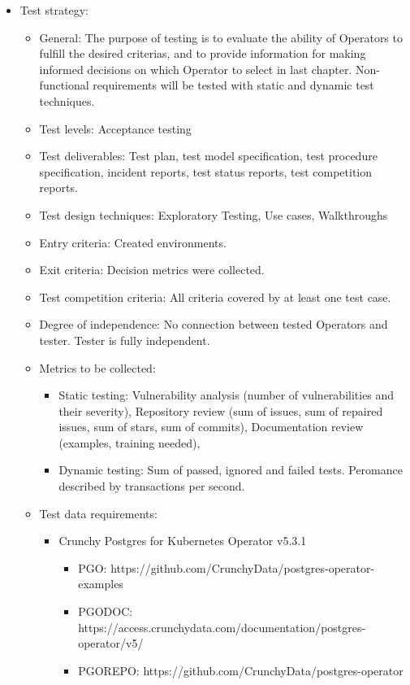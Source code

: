 \begin{itemize}
\begin{itemize}
          \end{itemize}
    \item Test strategy:
          \begin{itemize}
              \item General: The purpose of testing is to evaluate the ability of Operators to fulfill the desired criterias, and to provide information for making informed decisions on which Operator to select in last chapter. Non-functional requirements will be tested with static and dynamic test techniques.
              \item Test levels: Acceptance testing
              \item Test deliverables: Test plan, test model specification, test procedure specification, incident reports, test status reports, test competition reports.
              \item Test design techniques: Exploratory Testing, Use cases, Walkthroughs
              \item Entry criteria: Created environments.
              \item Exit criteria: Decision metrics were collected.
              \item Test competition criteria: All criteria covered by at least one test case.
              \item Degree of independence: No connection between tested Operators and tester. Tester is fully independent.
              \item Metrics to be collected:
                    \begin{itemize}
                        \item Static testing: Vulnerability analysis (number of vulnerabilities and their severity), Repository review (sum of issues, sum of repaired issues, sum of stars, sum of commits), Documentation review (examples, training needed),
                        \item Dynamic testing:  Sum of passed, ignored and failed tests. Peromance described by transactions per second.
                    \end{itemize}
              \item Test data requirements:
                    \begin{itemize}
                        \item Crunchy Postgres for Kubernetes Operator v5.3.1
                              \begin{itemize}
                                  \item PGO: https://github.com/CrunchyData/postgres-operator-examples
                                  \item PGODOC: https://access.crunchydata.com/documentation/postgres-operator/v5/
                                  \item PGOREPO: https://github.com/CrunchyData/postgres-operator
                              \end{itemize}


\end{itemize}
\end{itemize}
\end{itemize}
